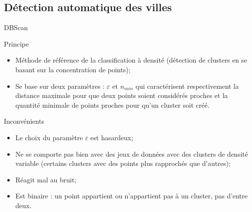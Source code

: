 \subsection{Détection automatique des villes}
\insertsubsectionframe

\begin{frame}{DBScan}
    \begin{block}{Principe}
        \begin{itemize}
            \item Méthode de référence de la classification à densité (détection de clusters en se basant sur la concentration de points);
            \item Se base sur deux paramètres : $\varepsilon$ et $n_{min}$ qui caractérisent respectivement la distance maximale pour que deux points soient considérés \og proches \fg{} et la quantité minimale de points proches pour qu'un cluster soit créé.
        \end{itemize}
    \end{block}

    \begin{block}{Inconvénients}
        \begin{itemize}
            \item Le choix du paramètre $\varepsilon$ est hasardeux;
            \item Ne se comporte pas bien avec des jeux de données avec des clusters de densité variable (certains clusters avec des points plus rapprochés que d'autres);
            \item Réagit mal au bruit;
            \item Est binaire : un point appartient ou n'appartient pas à un cluster, pas d'entre deux.
        \end{itemize}
    \end{block}
\end{frame}

